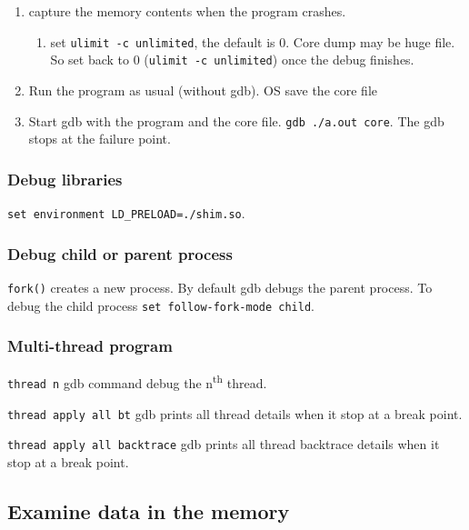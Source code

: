 \begin{enumerate}
  \item capture the memory contents when the program crashes.
  \begin{enumerate}
    \item set \texttt{ulimit -c unlimited}, the default is 0.
      Core dump may be huge file. So set back to 0 (\texttt{ulimit -c unlimited}) once the debug finishes.
  \end{enumerate}
\item Run the program as usual (without gdb). OS save the core file
\item Start gdb with the program and the core file.
\texttt{gdb ./a.out core}.
The gdb stops at the failure point.
\end{enumerate}

\subsubsection{Debug libraries}
\texttt{set environment LD\_PRELOAD=./shim.so}.

\subsubsection{Debug child or parent process}
\texttt{fork()} creates a new process.
By default gdb debugs the parent process.
To debug the child process \texttt{set follow-fork-mode child}.

\subsubsection{Multi-thread program}
\texttt{thread n} gdb command debug the n\textsuperscript{th} thread.

\texttt{thread apply all bt} gdb prints all thread details when it stop at a break point.

\texttt{thread apply all backtrace} gdb prints all thread backtrace details when it stop at a break point.

\subsection{Examine data in the memory}

